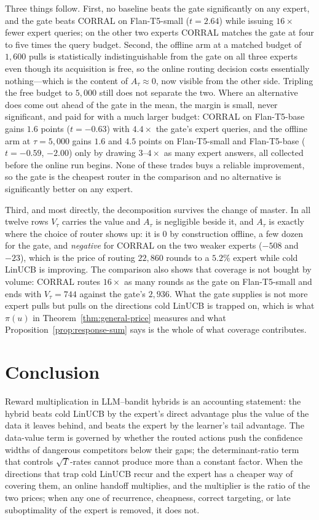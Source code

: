 \documentclass{article}
\theoremstyle{definition}
\theoremstyle{remark}
\theoremstyle{remark}
\begin{document}
Three things follow. First, no baseline beats the gate significantly on any
expert, and the gate beats CORRAL on Flan-T5-small ($t=2.64$) while issuing
$16\times$ fewer expert queries; on the other two experts CORRAL matches the
gate at four to five times the query budget. Second, the offline arm at a
matched budget of $1{,}600$ pulls is statistically indistinguishable from the
gate on all three experts even though its acquisition is free, so the online
routing decision costs essentially nothing---which is the content of
$A_\tau\approx0$, now visible from the other side. Tripling the free budget to
$5{,}000$ still does not separate the two. Where an alternative does come out
ahead of the gate in the mean, the margin is small, never significant, and
paid for with a much larger budget: CORRAL on Flan-T5-base gains $1.6$
points ($t=-0.63$) with $4.4\times$ the gate's expert queries, and the
offline arm at $\tau=5{,}000$ gains $1.6$ and $4.5$ points on Flan-T5-small
and Flan-T5-base ($t=-0.59$, $-2.00$) only by drawing $3$--$4\times$ as many
expert answers, all collected before the online run begins. None of these
trades buys a reliable improvement, so the gate is the cheapest router in
the comparison and no alternative is significantly better on any expert.

Third, and most directly, the decomposition survives the change of master. In
all twelve rows $V_\tau$ carries the value and $A_\tau$ is negligible beside
it, and $A_\tau$ is exactly where the choice of router shows up: it is $0$ by
construction offline, a few dozen for the gate, and \emph{negative} for CORRAL
on the two weaker experts ($-508$ and $-23$), which is the price of routing
$22{,}860$ rounds to a $5.2\%$ expert while cold LinUCB is improving. The
comparison also shows that coverage is not bought by volume: CORRAL routes
$16\times$ as many rounds as the gate on Flan-T5-small and ends with
$V_\tau=744$ against the gate's $2{,}936$. What the gate supplies is not more
expert pulls but pulls on the directions cold LinUCB is trapped on, which is
what $\pi(u)$ in Theorem~\ref{thm:general-price} measures and what
Proposition~\ref{prop:response-sum} says is the whole of what coverage contributes.

\section{Conclusion}
\label{sec:conclusion}

Reward multiplication in LLM--bandit hybrids is an accounting statement: the
hybrid beats cold LinUCB by the expert's direct advantage plus the value of the
data it leaves behind, and beats the expert by the learner's tail advantage.
The data-value term is governed by whether the routed actions push the
confidence widths of dangerous competitors below their gaps; the
determinant-ratio term that controls $\sqrt T$-rates cannot produce more than
a constant factor. When the directions that trap cold LinUCB recur and the
expert has a cheaper way of covering them, an online handoff multiplies, and
the multiplier is the ratio of the two prices; when any one of recurrence,
cheapness, correct targeting, or late suboptimality of the expert is removed,
it does not.
\end{document}
